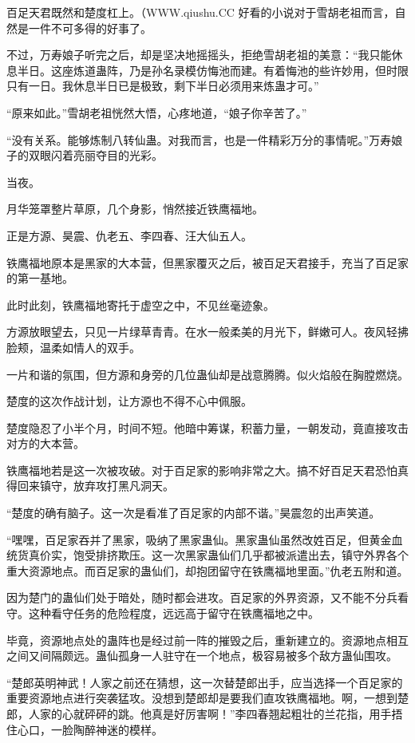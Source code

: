 \begin{this_body}
百足天君既然和楚度杠上。（WWW.qiushu.CC 好看的小说对于雪胡老祖而言，自然是一件不可多得的好事了。

不过，万寿娘子听完之后，却是坚决地摇摇头，拒绝雪胡老祖的美意：“我只能休息半日。这座炼道蛊阵，乃是孙名录模仿悔池而建。有着悔池的些许妙用，但时限只有一日。我休息半日已是极致，剩下半日必须用来炼蛊才可。”

“原来如此。”雪胡老祖恍然大悟，心疼地道，“娘子你辛苦了。”

“没有关系。能够炼制八转仙蛊。对我而言，也是一件精彩万分的事情呢。”万寿娘子的双眼闪着亮丽夺目的光彩。

当夜。

月华笼罩整片草原，几个身影，悄然接近铁鹰福地。

正是方源、昊震、仇老五、李四春、汪大仙五人。

铁鹰福地原本是黑家的大本营，但黑家覆灭之后，被百足天君接手，充当了百足家的第一基地。

此时此刻，铁鹰福地寄托于虚空之中，不见丝毫迹象。

方源放眼望去，只见一片绿草青青。在水一般柔美的月光下，鲜嫩可人。夜风轻拂脸颊，温柔如情人的双手。

一片和谐的氛围，但方源和身旁的几位蛊仙却是战意腾腾。似火焰般在胸膛燃烧。

楚度的这次作战计划，让方源也不得不心中佩服。

楚度隐忍了小半个月，时间不短。他暗中筹谋，积蓄力量，一朝发动，竟直接攻击对方的大本营。

铁鹰福地若是这一次被攻破。对于百足家的影响非常之大。搞不好百足天君恐怕真得回来镇守，放弃攻打黑凡洞天。

“楚度的确有脑子。这一次是看准了百足家的内部不谐。”昊震忽的出声笑道。

“嘿嘿，百足家吞并了黑家，吸纳了黑家蛊仙。黑家蛊仙虽然改姓百足，但黄金血统货真价实，饱受排挤欺压。这一次黑家蛊仙们几乎都被派遣出去，镇守外界各个重大资源地点。而百足家的蛊仙们，却抱团留守在铁鹰福地里面。”仇老五附和道。

因为楚门的蛊仙们处于暗处，随时都会进攻。百足家的外界资源，又不能不分兵看守。这种看守任务的危险程度，远远高于留守在铁鹰福地之中。

毕竟，资源地点处的蛊阵也是经过前一阵的摧毁之后，重新建立的。资源地点相互之间又间隔颇远。蛊仙孤身一人驻守在一个地点，极容易被多个敌方蛊仙围攻。

“楚郎英明神武！人家之前还在猜想，这一次替楚郎出手，应当选择一个百足家的重要资源地点进行突袭猛攻。没想到楚郎却是要我们直攻铁鹰福地。啊，一想到楚郎，人家的心就砰砰的跳。他真是好厉害啊！”李四春翘起粗壮的兰花指，用手捂住心口，一脸陶醉神迷的模样。


\end{this_body}
